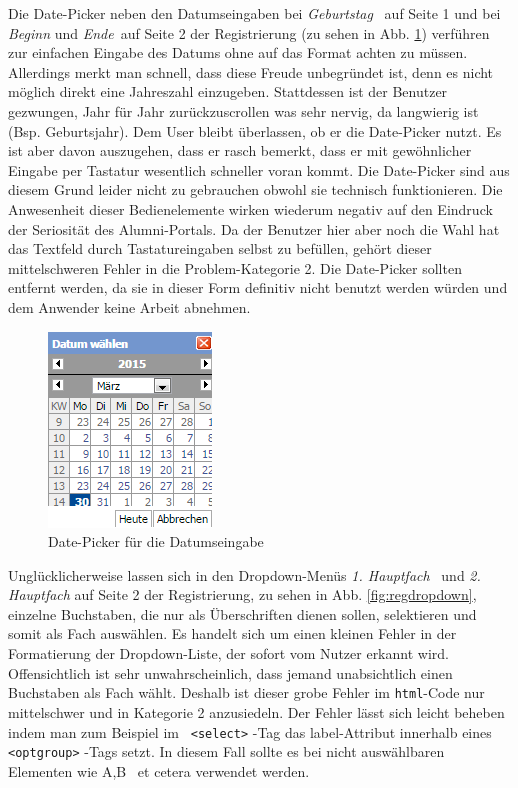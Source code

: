 { Die Date-Picker neben den Datumseingaben bei \emph{Geburtstag} ~auf Seite 1 und bei \emph{Beginn} und \emph{Ende}~auf Seite 2 der Registrierung (zu sehen in Abb. \ref{fig:regdatepick}) verführen zur einfachen Eingabe des Datums ohne auf das Format achten zu müssen. Allerdings merkt man schnell, dass diese Freude unbegründet ist, denn es nicht möglich direkt eine Jahreszahl einzugeben. Stattdessen ist der Benutzer gezwungen, Jahr für Jahr zurückzuscrollen was sehr nervig, da langwierig ist (Bsp. Geburtsjahr).
}
{ Dem User bleibt überlassen, ob er die Date-Picker nutzt. Es ist aber davon auszugehen, dass er rasch bemerkt, dass er mit gewöhnlicher Eingabe per Tastatur wesentlich schneller voran kommt. Die Date-Picker sind aus diesem Grund leider nicht zu gebrauchen obwohl sie technisch funktionieren. Die Anwesenheit dieser Bedienelemente wirken wiederum negativ auf den Eindruck der Seriosität des Alumni-Portals. Da der Benutzer hier aber noch die Wahl hat das Textfeld durch Tastatureingaben selbst zu befüllen, gehört dieser mittelschweren Fehler in die Problem-Kategorie 2.
}
{ Die Date-Picker sollten entfernt werden, da sie in dieser Form definitiv nicht benutzt werden würden und dem Anwender keine Arbeit abnehmen.
}
\label{prob:reg:uselesspickerz}

\begin{figure}
	\centering
		\includegraphics{figures/datepicker.png}
	\caption{Date-Picker für die Datumseingabe}
	\label{fig:regdatepick}
\end{figure}

{ Unglücklicherweise lassen sich in den Dropdown-Menüs \emph{1. Hauptfach} ~und \emph{2. Hauptfach} auf Seite 2 der Registrierung, zu sehen in Abb. \ref{fig:regdropdown}, einzelne Buchstaben, die nur als Überschriften dienen sollen, selektieren und somit als Fach auswählen. 
}
{ Es handelt sich um einen kleinen Fehler in der Formatierung der Dropdown-Liste, der sofort vom Nutzer erkannt wird. Offensichtlich ist sehr unwahrscheinlich, dass jemand unabsichtlich einen Buchstaben als Fach wählt. Deshalb ist dieser grobe Fehler im \texttt{html}-Code nur mittelschwer und in Kategorie 2 anzusiedeln.
}
{ Der Fehler lässt sich leicht beheben indem man zum Beispiel im \texttt{ \textless select\textgreater} -Tag das label-Attribut innerhalb eines \texttt{ \textless optgroup\textgreater  } -Tags setzt. In diesem Fall sollte es bei nicht auswählbaren Elementen wie \glqq A\grqq,\glqq B\grqq~ et cetera verwendet werden.
} 
\label{prob:reg:buchstabe}

